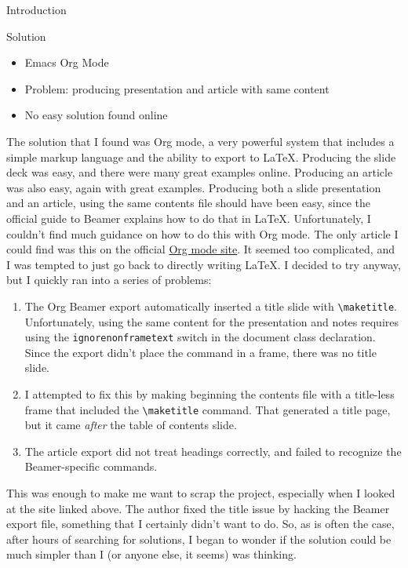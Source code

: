 \documentclass[11pt]{article}
\begin{document}
\begin{frame}[label={sec:org32a16a2},fragile]{Introduction}
\begin{block}{Solution}
\begin{itemize}
\item Emacs Org Mode
\item Problem: producing presentation and article with same content
\item No easy solution found online
\end{itemize}
\end{block}
The solution that I found was Org mode, a very powerful system that includes a simple markup language and the ability to export to \LaTeX. Producing the slide deck was easy, and there were many great examples online. Producing an article was also easy, again with great examples. Producing both a slide presentation and an article, using the same contents file should have been easy, since the official guide to Beamer explains how to do that in \LaTeX. Unfortunately, I couldn't find much guidance on how to do this with Org mode. The only article I could find was this on the official \href{https://orgmode.org/worg/exporters/beamer/beamer-dual-format.html}{Org mode site}. It seemed too complicated, and I was tempted to just go back to directly writing \LaTeX. I decided to try anyway, but I quickly ran into a series of problems:

\begin{enumerate}
\item The Org Beamer export automatically inserted a title slide with \texttt{\textbackslash{}maketitle}. Unfortunately, using the same content for the presentation and notes requires using the \texttt{ignorenonframetext} switch in the document class declaration. Since the export didn't place the command in a frame, there was no title slide.
\item I attempted to fix this by making beginning the contents file with a title-less frame that included the \texttt{\textbackslash{}maketitle} command. That generated a title page, but it came \emph{after} the table of contents slide.
\item The article export did not treat headings correctly, and failed to recognize the Beamer-specific commands.
\end{enumerate}

This was enough to make me want to scrap the project, especially when I looked at the site linked above. The author fixed the title issue by hacking the Beamer export file, something that I certainly didn't want to do. So, as is often the case, after hours of searching for solutions, I began to wonder if the solution could be much simpler than I (or anyone else, it seems) was thinking.
\end{frame}
\end{document}
